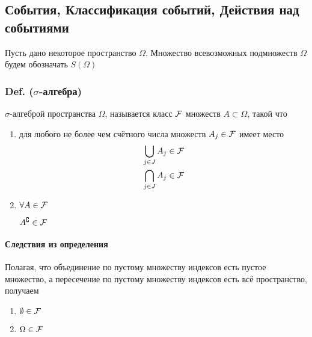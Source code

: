 \subsection{События, Классификация событий, Действия над
событиями}\label{ux441ux43eux431ux44bux442ux438ux44f-ux43aux43bux430ux441ux441ux438ux444ux438ux43aux430ux446ux438ux44f-ux441ux43eux431ux44bux442ux438ux439-ux434ux435ux439ux441ux442ux432ux438ux44f-ux43dux430ux434-ux441ux43eux431ux44bux442ux438ux44fux43cux438}

Пусть дано некоторое пространство \(\Omega\). Множество всевозможных
подмножеств \(\Omega\) будем обозначать \(S(\Omega)\)

\subsubsection{\texorpdfstring{Def.
(\(\sigma\)-алгебра)}{Def. (\textbackslash{}sigma-алгебра)}}\label{def.-sigma-ux430ux43bux433ux435ux431ux440ux430}

\(\sigma\)-алгеброй пространства \(\Omega\), называется класс
\(\mathcal F\) множеств \(A\subset\Omega\), такой что

\begin{enumerate}
\def\labelenumi{\arabic{enumi}.}
\item
  для любого не более чем счётного числа множеств
  \(A_{j}\in\mathcal F\) имеет место \[\begin{aligned}
  & \bigcup_{j\in J} A_{j} \in \mathcal F \\
  & \bigcap_{j\in J} A_{j} \in \mathcal F
  \end{aligned}\]
\item
  \(\forall A\in\mathcal F\)\quad

  \(A^\complement \in \mathcal F\)
\end{enumerate}

\paragraph{Следствия из
определения}\label{ux441ux43bux435ux434ux441ux442ux432ux438ux44f-ux438ux437-ux43eux43fux440ux435ux434ux435ux43bux435ux43dux438ux44f}

Полагая, что объединение по пустому множеству индексов есть пустое
множество, а пересечение по пустому множеству индексов есть всё
пространство, получаем

\begin{enumerate}
\def\labelenumi{\arabic{enumi}.}

\item
  \(\emptyset\in\mathcal F\)
\item
  \(\Omega\in\mathcal F\)
\end{enumerate}

